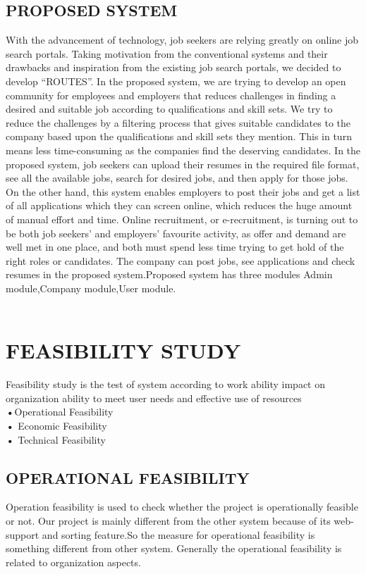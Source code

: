 \documentclass[12pt,a4paper,final]{extreport}
\begin{document}
\subsection{PROPOSED SYSTEM}
\hspace{01.5cm}With the advancement of technology, job seekers are relying greatly on online job search portals. Taking motivation from the conventional systems and their drawbacks and inspiration from the existing job search portals, we decided to develop “ROUTES”. In the proposed system, we are trying to develop an open community for employees and employers that reduces challenges in finding a desired and suitable job according to qualifications and skill sets. We try to reduce the challenges by a filtering process that gives suitable candidates to the company based upon the qualifications and skill sets they mention. This in turn means less time-consuming as the companies find the deserving candidates. In the proposed system, job seekers can upload their resumes in the required file format, see all the available jobs, search for desired jobs, and then apply for those jobs. On the other hand, this system enables employers to post their jobs and get a list of all applications which they can screen online, which reduces the huge amount of manual effort and time. Online recruitment, or e-recruitment, is turning out to be both job seekers' and employers’ favourite activity, as offer and demand are well met in one place, and both must spend less time trying to get hold of the right roles or candidates. The company can post jobs, see applications and check resumes in the proposed system.Proposed system has three modules Admin module,Company module,User module.\\
\\

\section{FEASIBILITY STUDY}
\hspace{01.5cm}Feasibility study is the test of system according to work ability impact on organization ability to meet user needs and effective use of resources\\
\textbf{•}Operational Feasibility \\
\textbf{•} Economic Feasibility \\ 
\textbf{•} Technical Feasibility\\

\subsection{OPERATIONAL FEASIBILITY}
\hspace{01.5cm}Operation feasibility is used to check whether the project is operationally feasible or not. Our
project is mainly different from the other system because of its web-support and sorting  feature.So the
measure for operational feasibility is something different from other system. Generally the
operational feasibility is related to organization aspects.
\end{document}
